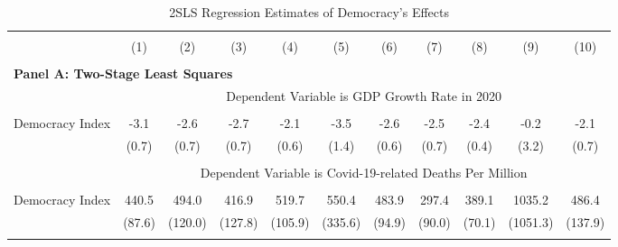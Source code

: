 
\begin{table}[!htbp]  \centering
  \caption{2SLS Regression Estimates of Democracy's Effects}
  \label{tab:2sls} 
  \footnotesize
  \begin{threeparttable}
\begin{tabular}{@{\extracolsep{0pt}}lcccccccccc} 
\\[-1.8ex]\hline 
\hline 
\\[-1.8ex] & (1) & (2) & (3) & (4) & (5) & (6) & (7) & (8) & (9) & (10)\\ 
\hline \\[-1.8ex] 
\multicolumn{11}{l}{\textbf{Panel A: Two-Stage Least Squares}} \\ 
  
 & \multicolumn{10}{c}{Dependent Variable is GDP Growth Rate in 2020} \\ 
\cline{2-11}  \\[-1.8ex]
Democracy Index     &        -3.1\sym{***}&        -2.6\sym{***}&        -2.7\sym{***}&        -2.1\sym{***}&        -3.5\sym{*}  &        -2.6\sym{***}&        -2.5\sym{***}&        -2.4\sym{***}&        -0.2         &        -2.1\sym{**} \\
                    &       (0.7)         &       (0.7)         &       (0.7)         &       (0.6)         &       (1.4)         &       (0.6)         &       (0.7)         &       (0.4)         &       (3.2)         &       (0.7)        \\ \\

 
& \multicolumn{10}{c}{Dependent Variable is Covid-19-related Deaths Per Million} \\ 
\cline{2-11}  \\[-1.8ex]
Democracy Index     &       440.5\sym{***}&       494.0\sym{***}&       416.9\sym{**} &       519.7\sym{***}&       550.4         &       483.9\sym{***}&       297.4\sym{***}&       389.1\sym{***}&      1035.2         &       486.4\sym{***}\\
                    &      (87.6)         &     (120.0)         &     (127.8)         &     (105.9)         &     (335.6)         &      (94.9)         &      (90.0)         &      (70.1)         &    (1051.3)         &     (137.9)         \\ \\
 


\end{tabular}
\end{threeparttable}
\end{table}
